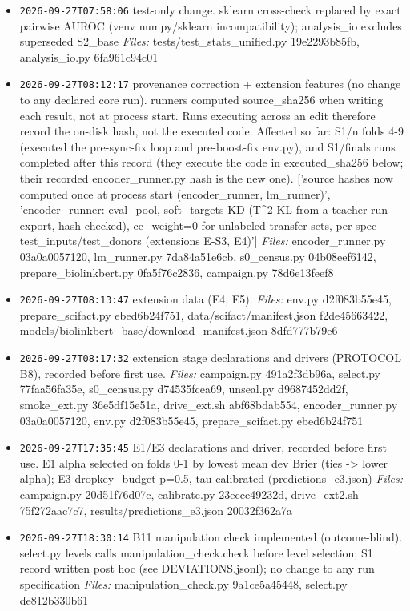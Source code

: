 \documentclass[11pt]{article}
\begin{document}
\begin{itemize}
\item \texttt{2026-09-27T07:58:06} test-only change. sklearn cross-check replaced by exact pairwise AUROC (venv numpy/sklearn incompatibility); analysis\_io excludes superseded S2\_base \emph{Files:} tests/test\_stats\_unified.py 19e2293b85fb, analysis\_io.py 6fa961c94c01
\item \texttt{2026-09-27T08:12:17} provenance correction + extension features (no change to any declared core run). runners computed source\_sha256 when writing each result, not at process start. Runs executing across an edit therefore record the on-disk hash, not the executed code. Affected so far: S1/n folds 4-9 (executed the pre-sync-fix loop and pre-boost-fix env.py), and S1/finals runs completed after this record (they execute the code in executed\_sha256 below; their recorded encoder\_runner.py hash is the new one). ['source hashes now computed once at process start (encoder\_runner, lm\_runner)', 'encoder\_runner: eval\_pool, soft\_targets KD (T\textasciicircum{}2 KL from a teacher run export, hash-checked), ce\_weight=0 for unlabeled transfer sets, per-spec test\_inputs/test\_donors (extensions E-S3, E4)'] \emph{Files:} encoder\_runner.py 03a0a0057120, lm\_runner.py 7da84a51e6cb, s0\_census.py 04b08eef6142, prepare\_biolinkbert.py 0fa5f76c2836, campaign.py 78d6e13feef8
\item \texttt{2026-09-27T08:13:47} extension data (E4, E5).  \emph{Files:} env.py d2f083b55e45, prepare\_scifact.py ebed6b24f751, data/scifact/manifest.json f2de45663422, models/biolinkbert\_base/download\_manifest.json 8dfd777b79e6
\item \texttt{2026-09-27T08:17:32} extension stage declarations and drivers (PROTOCOL B8), recorded before first use.  \emph{Files:} campaign.py 491a2f3db96a, select.py 77faa56fa35e, s0\_census.py d74535fcea69, unseal.py d9687452dd2f, smoke\_ext.py 36e5df15e51a, drive\_ext.sh abf68bdab554, encoder\_runner.py 03a0a0057120, env.py d2f083b55e45, prepare\_scifact.py ebed6b24f751
\item \texttt{2026-09-27T17:35:45} E1/E3 declarations and driver, recorded before first use. E1 alpha selected on folds 0-1 by lowest mean dev Brier (ties -> lower alpha); E3 dropkey\_budget p=0.5, tau calibrated (predictions\_e3.json) \emph{Files:} campaign.py 20d51f76d07c, calibrate.py 23ecce49232d, drive\_ext2.sh 75f272aac7c7, results/predictions\_e3.json 20032f362a7a
\item \texttt{2026-09-27T18:30:14} B11 manipulation check implemented (outcome-blind). select.py levels calls manipulation\_check.check before level selection; S1 record written post hoc (see DEVIATIONS.jsonl); no change to any run specification \emph{Files:} manipulation\_check.py 9a1ce5a45448, select.py de812b330b61

\end{itemize}
\end{document}
